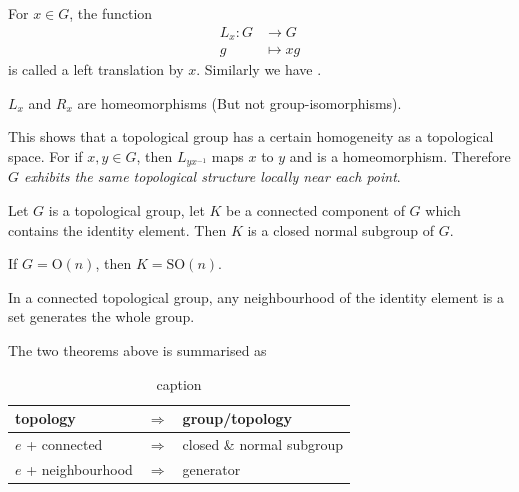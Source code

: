 \begin{defi}
    For $x\in G$, the function
    \begin{align}
        L_x: G &\to G \\
          g &\mapsto xg
    \end{align}
    is called a left translation by $x$. Similarly we have
    .
\end{defi}
\begin{fact}
    $L_x$ and $R_x$ are homeomorphisms (But not group-isomorphisms).
\end{fact}
\begin{remark}
    This shows that a topological group has a certain homogeneity as a
    topological space. For if $x,y\in G$, then $L_{yx^{-1}}$ maps $x$
    to $y$ and is a homeomorphism. Therefore \textit{$G$ exhibits the
    same topological structure locally near each point}.
\end{remark}
\begin{thm}
    Let $G$ is a topological group, let $K$ be a connected component of $G$
    which contains the identity element. Then $K$ is a closed normal
    subgroup of $G$.
\end{thm}
\begin{fact}
    If $G=\mathrm{O}(n)$, then $K=\mathrm{SO}(n)$.
\end{fact}
\begin{thm}
    In a connected topological group, any neighbourhood of the
    identity element is a set generates the whole group.
\end{thm}
The two theorems above is summarised as

\begin{table}[H]
    \centering
    \caption{caption}
    \begin{tabu}{l c l}
        topology            & $\Rightarrow$ & group/topology \\
        \hline
        $e$ + connected     & $\Rightarrow$ & closed \& normal subgroup \\
        $e$ + neighbourhood & $\Rightarrow$ & generator \\
        \bottomrule
    \end{tabu}
\end{table}

